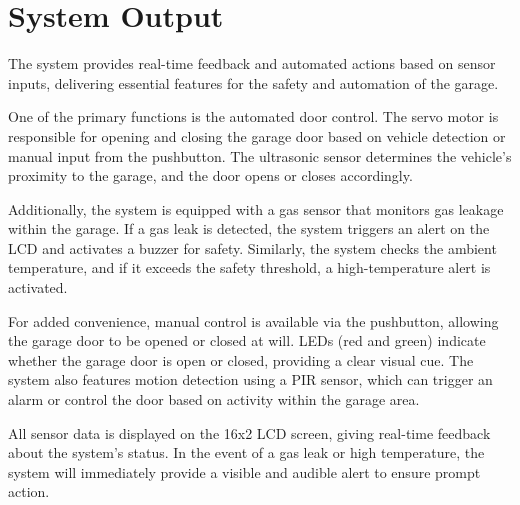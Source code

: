\documentclass{article}
\begin{document}
\section{System Output}
The system provides real-time feedback and automated actions based on sensor inputs, delivering essential features for the safety and automation of the garage.

One of the primary functions is the automated door control. The servo motor is responsible for opening and closing the garage door based on vehicle detection or manual input from the pushbutton. The ultrasonic sensor determines the vehicle's proximity to the garage, and the door opens or closes accordingly.

Additionally, the system is equipped with a gas sensor that monitors gas leakage within the garage. If a gas leak is detected, the system triggers an alert on the LCD and activates a buzzer for safety. Similarly, the system checks the ambient temperature, and if it exceeds the safety threshold, a high-temperature alert is activated.

For added convenience, manual control is available via the pushbutton, allowing the garage door to be opened or closed at will. LEDs (red and green) indicate whether the garage door is open or closed, providing a clear visual cue. The system also features motion detection using a PIR sensor, which can trigger an alarm or control the door based on activity within the garage area.

All sensor data is displayed on the 16x2 LCD screen, giving real-time feedback about the system's status. In the event of a gas leak or high temperature, the system will immediately provide a visible and audible alert to ensure prompt action.
\end{document}
